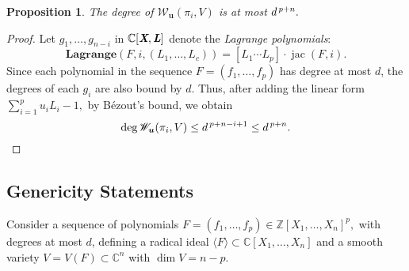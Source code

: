 \documentclass[a4paper]{article}
\def\Lb{\textit{\textbf{L}}}
\def\Xb{\textit{\textbf{X}}}
\def\ub{{\bm u}}
\DeclareMathOperator{\jac}{jac}
\newcommand{\ZZ}{{\mathbb{Z}}}
\def\C{\mathbb{C}}
\def\lagF{{\bm{Lagrange}}(F,i,(L_1,\hdots,L_c))}
\def\Wil{\mathscr{W}_{\ub}(\pi_i,V)}
\newtheorem{prop}[theorem]{Proposition}
\begin{document}
%
%
%
\vspace{2mm}
\begin{prop}
The degree of $\Wil$ is at most $d^{\hspace{.5mm}p+n}.$
\end{prop}
\begin{proof}
Let $g_1,\hdots,g_{n-i}$ in $\C[\Xb,\Lb]$ denote the \textit{Lagrange polynomials}:
\[
\lagF = [L_1 \cdots L_p]\cdot \jac (F,i).
\]
Since each polynomial in the sequence $F=(f_1,\hdots,f_p)$ has degree at most $d$, the degrees of each $g_i$ are also bound by $d.$  Thus, after adding the linear form $\sum_{i=1}^pu_iL_i-1,$ by B\'ezout's bound, we obtain
\[
\deg \Wil \leq d^{\hspace{.5mm}p+n-i+1} \leq d^{\hspace{.5mm}p+n}. 
\]
\end{proof}
%







\subsection{Genericity Statements}\label{sec:gen}
Consider a sequence of polynomials $F= (f_1,\hdots,f_p) \in \ZZ[X_1,\hdots,X_n]^p,$ with degrees at most $d$, defining a radical ideal $\langle F \rangle \subset \C[X_1,\hdots,X_n]$ and a smooth variety $V=V(F) \subset \C^n$ with $\dim V = n-p$. %
%
%
\end{document}
